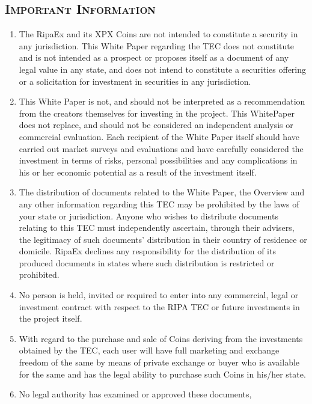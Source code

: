 \documentclass[11pt,fleqn]{book} %
\begin{document}
\begin{scriptsize}
{		\section{\textsc{Important Information}}
		\begin{enumerate}
			\item The RipaEx and its XPX Coins are not intended to constitute
			a security in any jurisdiction.
			This White Paper regarding the TEC does not constitute
			and is not intended as a prospect or proposes itself
			as a document of any legal value in any state, and does
			not intend to constitute a securities offering or a
			solicitation for investment in securities in any jurisdiction.
			\item This White Paper is not, and should not be interpreted as a
			recommendation from the creators themselves for investing
			in the project. This WhitePaper does not replace, and
			should not be considered an independent analysis or commercial
			evaluation. Each recipient of the White Paper itself
			should have carried out market surveys and evaluations
			and have carefully considered the investment in terms of
			risks, personal possibilities and any complications in his or
			her economic potential as a result of the investment itself.
			\item The distribution of documents related to the White Paper,
			the Overview and any other information regarding this TEC
			may be prohibited by the laws of your state or jurisdiction.
			Anyone who wishes to distribute documents relating to this 
			TEC must independently ascertain, through their
			advisers, the legitimacy of such documents’ distribution
			in their country of residence or domicile. RipaEx declines
			any responsibility for the distribution of its produced
			documents in states where such distribution is restricted
			or prohibited.
			\item No person is held, invited or required to enter into any
			commercial, legal or investment contract with respect to
			the RIPA TEC or future investments in the project itself.
			\item With regard to the purchase and sale of Coins deriving
			from the investments obtained by the TEC, each user will
			have full marketing and exchange freedom of the same by
			means of private exchange or buyer who is available for
			the same and has the legal ability to purchase such Coins
			in his/her state.
			\item No legal authority has examined or approved these documents,

\end{enumerate}}
\end{scriptsize}
\end{document}
